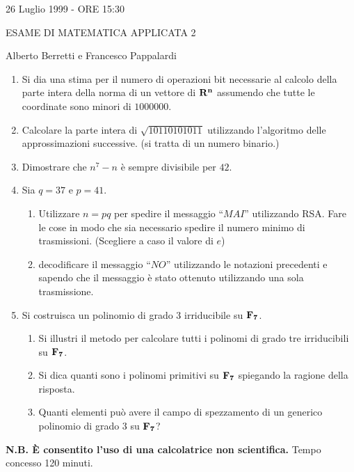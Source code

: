 \documentclass{article}
\begin{document}
\centerline{26 Luglio 1999 - ORE 15:30}
\centerline{ESAME DI MATEMATICA APPLICATA 2}
\centerline{Alberto Berretti e Francesco Pappalardi}\bigskip

\begin{enumerate}

\item Si dia una stima per il numero di operazioni
bit necessarie al calcolo della parte intera 
della norma di un vettore di $\bf R^n$ assumendo
che tutte le coordinate sono minori di $1000000$.

\item 
Calcolare la parte intera di $\sqrt{10110101011}$ utilizzando
l'algoritmo delle approssimazioni successive. (si tratta di un
numero binario.)
\bigskip\bigskip

\item Dimostrare che $n^7-n$ \`e sempre divisibile per $42$.
\bigskip\bigskip

\item Sia $q=37$ e $p=41$. 
\begin{enumerate}
\item Utilizzare $n=pq$ per spedire il 
messaggio ``$MAI$'' utilizzando RSA. Fare le cose in modo che
sia necessario spedire il numero minimo di trasmissioni.
(Scegliere a caso il valore di $e$)
\item decodificare il messaggio ``$NO$'' utilizzando le notazioni precedenti 
e sapendo che il messaggio \`e stato ottenuto utilizzando una
sola trasmissione.
\end{enumerate}
 \bigskip\bigskip

\item Si costruisca un polinomio di grado $3$ irriducibile
su $\bf F_7$.
\begin{enumerate}
\item Si illustri il metodo per calcolare tutti i polinomi
di grado tre irriducibili su $\bf F_7$.
\item Si dica quanti sono i polinomi primitivi su $\bf F_7$
spiegando la ragione della risposta.
\item Quanti elementi pu\`o avere il campo di spezzamento
di un generico polinomio di grado $3$ su $\bf F_7$?
\end{enumerate} \bigskip\bigskip
\end{enumerate}

{\bf N.B. \`E consentito l'uso di una calcolatrice non scientifica.}
Tempo concesso 120 minuti.
\end{document}
